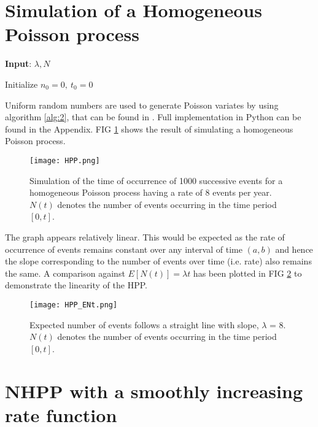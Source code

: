 \documentclass[%
 reprint,
 amsmath,amssymb,
 aps,
]{revtex4-2}
\theoremstyle{definition}
\begin{document}
\section{\label{q:3}Simulation of a Homogeneous Poisson process}

\begin{algorithm}
\label{alg:2}
\caption{Simulation of a Homogeneous Poisson Process with Rate $\lambda$, on $[0, T]$. Slight variation of Algorithm 1 in Chen, 2016 \cite{chen}}
\textbf{Input}: $\lambda,N$

Initialize $n_0 = 0 ,\  t_0 = 0$\;
\end{algorithm}

Uniform random numbers are used to generate Poisson variates by using algorithm \ref{alg:2}, that can be found in \cite{chen}. Full implementation in Python can be found in the Appendix. FIG \ref{fig:hpp} shows the result of simulating a homogeneous Poisson process.

\begin{figure}[H]
\centering
\texttt{[image: HPP.png]}
\caption{\label{fig:hpp}Simulation of the time of occurrence of 1000 successive events for a homogeneous Poisson process having a rate of 8 events per year. $N(t)$ denotes the number of events occurring in the time period $[0,t]$.}
\end{figure}

The graph appears relatively linear. This would be expected as the rate of occurrence of events remains constant over any interval of time $(a,b)$ and hence the slope corresponding to the number of events over time (i.e. rate) also remains the same. A comparison against $E[N(t)] = \lambda t$ has been plotted in FIG \ref{fig:hppent} to demonstrate the linearity of the HPP.

\begin{figure}[H]
\centering
\texttt{[image: HPP\_ENt.png]}
\caption{\label{fig:hppent}Expected number of events follows a straight line with slope, $\lambda$ = 8. $N(t)$ denotes the number of events occurring in the time period $[0,t]$.}
\end{figure}

\section{\label{q:4}NHPP with a smoothly increasing rate function}
\end{document}
